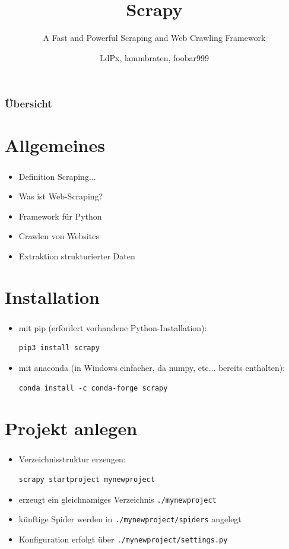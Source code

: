 \documentclass{beamer}
\title{Scrapy}
\subtitle{A Fast and Powerful Scraping and Web Crawling Framework}
\author{LdPx, lammbraten, foobar999}
\begin{document}
\frame{\titlepage}
\begin{frame}
	\frametitle{Übersicht}
	\tableofcontents
\end{frame}
\section{Allgemeines}
\begin{frame}
	\frametitle{\insertsection}
	\begin{itemize}
		\item  Definition Scraping...
		\item  Was ist Web-Scraping?
		\item  Framework für Python
		\item  Crawlen von Websites
		\item  Extraktion strukturierter Daten
	\end{itemize} 
\end{frame}

\section{Installation}
\begin{frame}[fragile]
	\frametitle{\insertsection}
	\begin{itemize}
		\item mit pip (erfordert vorhandene Python-Installation):
			\begin{lstlisting}
pip3 install scrapy
			\end{lstlisting}
		\item mit anaconda (in Windows einfacher, da numpy, etc... bereits enthalten):
			\begin{lstlisting}
conda install -c conda-forge scrapy
			\end{lstlisting}
	\end{itemize}
\end{frame}

\section{Projekt anlegen}
\begin{frame}[fragile]
	\frametitle{\insertsection}
	\begin{itemize}
		\item Verzeichnisstruktur erzeugen:
			\begin{lstlisting}
scrapy startproject mynewproject
			\end{lstlisting}
		\item erzeugt ein gleichnamiges Verzeichnis \verb|./mynewproject| 
		\item künftige Spider werden in \verb|./mynewproject/spiders| angelegt
		\item Konfiguration erfolgt über \verb|./mynewproject/settings.py|
	\end{itemize}
\end{frame}
\end{document}
